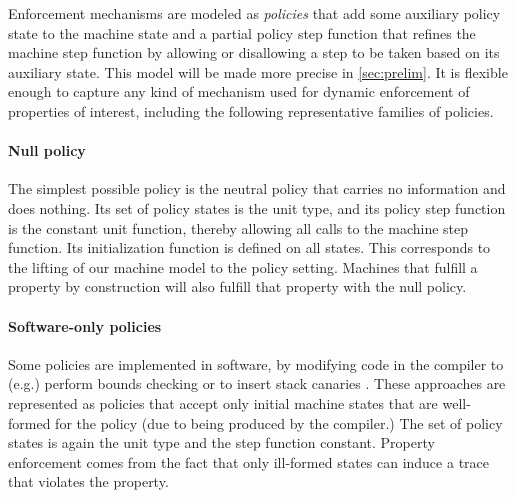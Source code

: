 \documentclass[acmsmall,review,anonymous]{acmart}\settopmatter{printfolios=true,printccs=false,printacmref=false}
\begin{document}

Enforcement mechanisms are modeled as {\em policies} that add some auxiliary
policy state to the machine state and a partial policy step function that
refines the machine step function by allowing or disallowing a step to be taken
based on its auxiliary state. This model will be made more precise in
\cref{sec:prelim}. It is flexible enough to capture any kind of mechanism used
for dynamic enforcement of properties of interest, including the following
representative families of policies.


\paragraph*{Null policy}
%
The simplest possible policy is the neutral policy that carries no information
and does nothing. Its set of policy states is the unit type, and its policy step
function is the constant unit function, thereby allowing all calls to the machine
step function. Its initialization function is defined on all states. This
corresponds to the lifting of our machine model to the policy setting. Machines
that fulfill a property by construction will also fulfill that property with the
null policy.

\paragraph*{Software-only policies}
%
Some policies are implemented in software, by modifying code in the compiler to
(e.g.) perform bounds checking \citep{NagarakatteZMZ09} or to insert stack
canaries \citep{Cowan+98}. These approaches are represented as policies that
accept only initial machine states that are well-formed for the policy (due to
being produced by the compiler.) The set of policy states is again the unit type
and the step function constant. Property enforcement comes from the fact that
only ill-formed states can induce a trace that violates the property.

\end{document}

